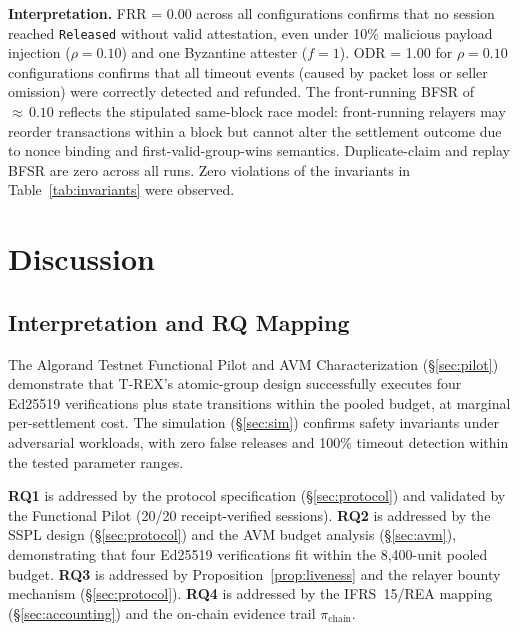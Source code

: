 \documentclass[journal]{IEEEtran}
\begin{document}
\noindent\textbf{Interpretation.}
FRR = 0.00 across all configurations confirms that no session
reached \texttt{Released} without valid attestation, even under
10\% malicious payload injection ($\rho = 0.10$) and one Byzantine
attester ($f = 1$).
ODR = 1.00 for $\rho = 0.10$ configurations confirms that all
timeout events (caused by packet loss or seller omission) were
correctly detected and refunded.
The front-running BFSR of ${\approx}\,0.10$ reflects the stipulated
same-block race model: front-running relayers may reorder
transactions within a block but cannot alter the settlement outcome
due to nonce binding and first-valid-group-wins semantics.
Duplicate-claim and replay BFSR are zero across all runs.
Zero violations of the invariants in Table~\ref{tab:invariants}
were observed.

\section{Discussion}
\label{sec:discussion}

\subsection{Interpretation and RQ Mapping}
The Algorand Testnet Functional Pilot and AVM Characterization
(\S\ref{sec:pilot}) demonstrate that T-REX's atomic-group design
successfully executes four Ed25519 verifications plus state
transitions within the pooled budget, at marginal per-settlement
cost.
The simulation (\S\ref{sec:sim}) confirms safety invariants under
adversarial workloads, with zero false releases and 100\% timeout
detection within the tested parameter ranges.

\noindent\textbf{RQ1} is addressed by the protocol specification
(\S\ref{sec:protocol}) and validated by the Functional Pilot
(20/20 receipt-verified sessions).
\textbf{RQ2} is addressed by the SSPL design
(\S\ref{sec:protocol}) and the AVM budget analysis
(\S\ref{sec:avm}), demonstrating that four Ed25519 verifications
fit within the 8{,}400-unit pooled budget.
\textbf{RQ3} is addressed by Proposition~\ref{prop:liveness} and
the relayer bounty mechanism (\S\ref{sec:protocol}).
\textbf{RQ4} is addressed by the IFRS~15/REA mapping
(\S\ref{sec:accounting}) and the on-chain evidence trail
$\pi_{\text{chain}}$.
\end{document}
